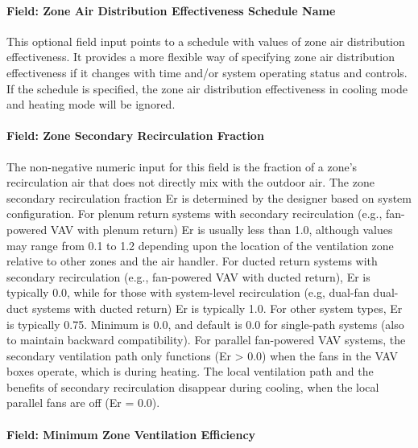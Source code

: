 \paragraph{Field: Zone Air Distribution Effectiveness Schedule Name}\label{field-zone-air-distribution-effectiveness-schedule-name}

This optional field input points to a schedule with values of zone air distribution effectiveness. It provides a more flexible way of specifying zone air distribution effectiveness if it changes with time and/or system operating status and controls. If the schedule is specified, the zone air distribution effectiveness in cooling mode and heating mode will be ignored.

\paragraph{Field: Zone Secondary Recirculation Fraction}\label{field-zone-secondary-recirculation-fraction}

The non-negative numeric input for this field is the fraction of a zone's recirculation air that does not directly mix with the outdoor air. The zone secondary recirculation fraction Er is determined by the designer based on system configuration. For plenum return systems with secondary recirculation (e.g., fan-powered VAV with plenum return) Er is usually less than 1.0, although values may range from 0.1 to 1.2 depending upon the location of the ventilation zone relative to other zones and the air handler. For ducted return systems with secondary recirculation (e.g., fan-powered VAV with ducted return), Er is typically 0.0, while for those with system-level recirculation (e.g, dual-fan dual-duct systems with ducted return) Er is typically 1.0. For other system types, Er is typically 0.75. Minimum is 0.0, and default is 0.0 for single-path systems (also to maintain backward compatibility). For parallel fan-powered VAV systems, the secondary ventilation path only functions (Er \textgreater{} 0.0) when the fans in the VAV boxes operate, which is during heating. The local ventilation path and the benefits of secondary recirculation disappear during cooling, when the local parallel fans are off (Er = 0.0).

\paragraph{Field: Minimum Zone Ventilation
Efficiency}\label{field-minimum-zone-ventilation-efficiency}

